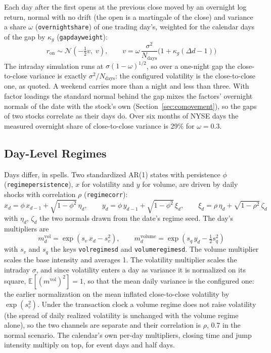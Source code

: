 \documentclass[11pt,a4paper]{article}
\newcommand{\key}[1]{\texttt{#1}}
\theoremstyle{paper}
\begin{document}
Each day after the first opens at the previous close moved by an overnight log return, normal with no drift (the open is a martingale of the close) and variance a share $\omega$ (\key{overnightshare}) of one trading day's, weighted for the calendar days of the gap by $\kappa_g$ (\key{gapdayweight}):
\begin{equation}
r_{\text{on}}\sim\mathcal N\!\left(-\tfrac12 v,\;v\right),\qquad v=\omega\,\frac{\sigma^2}{N_{\text{days}}}\bigl(1+\kappa_g(\Delta d-1)\bigr)
\end{equation}
The intraday simulation runs at $\sigma(1-\omega)^{1/2}$, so over a one-night gap the close-to-close variance is exactly $\sigma^2/N_{\text{days}}$: the configured volatility is the close-to-close one, as quoted. A weekend carries more than a night and less than three. With factor loadings the standard normal behind the gap mixes the factors' overnight normals of the date with the stock's own (Section~\ref{sec:comovement}), so the gaps of two stocks correlate as their days do. Over six months of NYSE days the measured overnight share of close-to-close variance is 29\% for $\omega=0.3$.

\subsection{Day-Level Regimes}

Days differ, in spells. Two standardized AR(1) states with persistence $\phi$ (\key{regimepersistence}), $x$ for volatility and $y$ for volume, are driven by daily shocks with correlation $\rho$ (\key{regimecorr}):
\begin{equation}
x_d=\phi\,x_{d-1}+\sqrt{1-\phi^2}\,\eta_d,\qquad y_d=\phi\,y_{d-1}+\sqrt{1-\phi^2}\,\xi_d,\qquad \xi_d=\rho\,\eta_d+\sqrt{1-\rho^2}\,\zeta_d
\end{equation}
with $\eta_d$, $\zeta_d$ the two normals drawn from the date's regime seed. The day's multipliers are
\begin{equation}
m_d^{\text{vol}}=\exp\left(s_v\,x_d-s_v^2\right),\qquad m_d^{\text{volume}}=\exp\left(s_q\,y_d-\tfrac12 s_q^2\right)
\end{equation}
with $s_v$ and $s_q$ the keys \key{volregimesd} and \key{volumeregimesd}. The volume multiplier scales the base intensity and averages 1. The volatility multiplier scales the intraday $\sigma$, and since volatility enters a day as variance it is normalized on its square, $\mathbb E[(m^{\text{vol}})^2]=1$, so that the mean daily variance is the configured one: the earlier normalization on the mean inflated close-to-close volatility by $\exp(s_v^2)$. Under the transaction clock a volume regime does not raise volatility (the spread of daily realized volatility is unchanged with the volume regime alone), so the two channels are separate and their correlation is $\rho$, 0.7 in the normal scenario. The calendar's own per-day multipliers, closing time and jump intensity multiply on top, for event days and half days.
\end{document}
